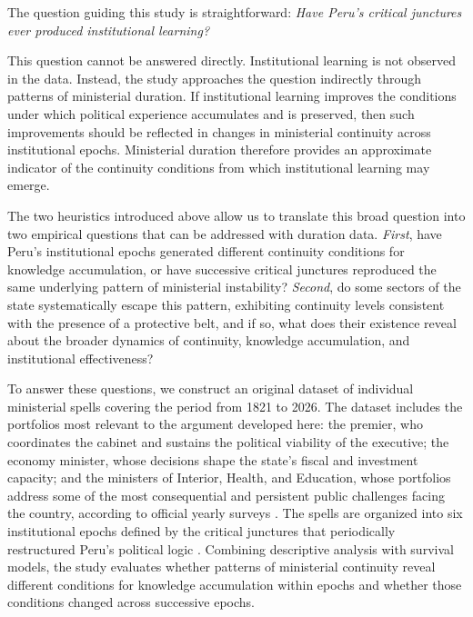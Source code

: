 \documentclass[doc, 12pt, a4paper,floatsintext]{apa7}
\begin{document}
The question guiding this study is straightforward: \emph{Have Peru's critical junctures ever produced institutional learning?}

This question cannot be answered directly. Institutional learning is not observed in the data. Instead, the study approaches the question indirectly through patterns of ministerial duration. If institutional learning improves the conditions under which political experience accumulates and is preserved, then such improvements should be reflected in changes in ministerial continuity across institutional epochs. Ministerial duration therefore provides an approximate indicator of the continuity conditions from which institutional learning may emerge.

The two heuristics introduced above allow us to translate this broad question into two empirical questions that can be addressed with duration data. \emph{First}, have Peru's institutional epochs generated different continuity conditions for knowledge accumulation, or have successive critical junctures reproduced the same underlying pattern of ministerial instability? \emph{Second}, do some sectors of the state systematically escape this pattern, exhibiting continuity levels consistent with the presence of a protective belt, and if so, what does their existence reveal about the broader dynamics of continuity, knowledge accumulation, and institutional effectiveness?

To answer these questions, we construct an original dataset of individual ministerial spells covering the period from 1821 to 2026. The dataset includes the portfolios most relevant to the argument developed here: the premier, who coordinates the cabinet and sustains the political viability of the executive; the economy minister, whose decisions shape the state's fiscal and investment capacity; and the ministers of Interior, Health, and Education, whose portfolios address some of the most consequential and persistent public challenges facing the country, according to official yearly surveys \parencite{inei_encuesta_2024}. The spells are organized into six institutional epochs defined by the critical junctures that periodically restructured Peru's political logic \parencite{lopez_jimenez_peru_2025}. Combining descriptive analysis with survival models, the study evaluates whether patterns of ministerial continuity reveal different conditions for knowledge accumulation within epochs and whether those conditions changed across successive epochs.
\end{document}
